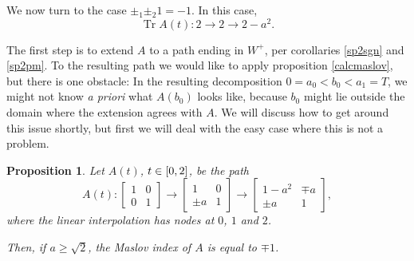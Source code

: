 \documentclass{article}
\newtheorem{prop}{Proposition}
\theoremstyle{nonumberplain}
\DeclareMathOperator{\trace}{Tr}
\begin{document}
We now turn to the case $\pm_1 \pm_2 1 = -1$. In this case,
\begin{equation}
\trace A(t) : 2 \to 2 \to 2 - a^2.
\end{equation}

The first step is to extend $A$ to a path ending in $W^+$, per corollaries \ref{sp2sgn} and \ref{sp2pm}. To the resulting path we would like to apply proposition \ref{calcmaslov}, but there is one obstacle: In the resulting decomposition $0 = a_0 < b_0 < a_1 = T$, we might not know \textit{a priori} what $A(b_0)$ looks like, because $b_0$ might lie outside the domain where the extension agrees with $A$. We will discuss how to get around this issue shortly, but first we will deal with the easy case where this is not a problem.

\begin{prop}\label{easymaslov}
Let $A(t)$, $t \in \interval02$, be the path
\begin{equation}
A(t):
\begin{bmatrix}
1 & 0\\
0 & 1
\end{bmatrix}
\to
\begin{bmatrix}
1 & 0\\
\pm a & 1
\end{bmatrix}
\to
\begin{bmatrix}
1 - a^2 &  \mp a\\
\pm a & 1
\end{bmatrix},
\end{equation}
where the linear interpolation has nodes at $0$, $1$ and $2$.

Then, if $a \geq \sqrt2$, the Maslov index of $A$ is equal to $\mp 1$.
\end{prop}
\end{document}

